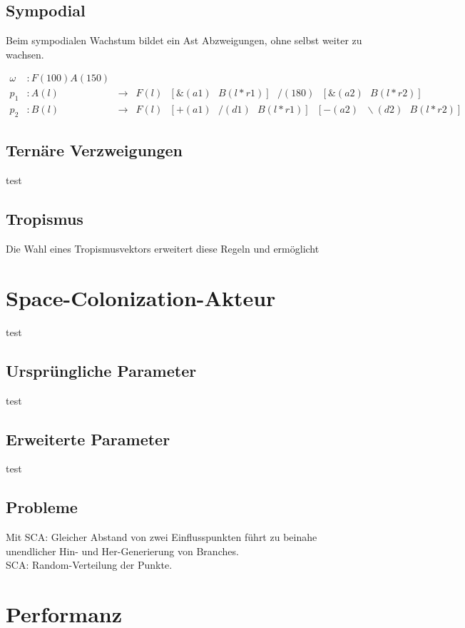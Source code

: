 \subsection{Sympodial}
Beim sympodialen Wachstum bildet ein Ast Abzweigungen, ohne selbst weiter zu wachsen. 

\begin{equation}
\begin{array}{llll}
\omega & : F(100)A(150) \\
p_1 & : A(l) &\rightarrow& F(l)\text{ }[\&(a1)\text{ }B(l*r1)]\text{ }/(180)\text{ }[\&(a2)\text{ }B(l*r2)] \\
p_2 &  : B(l) &\rightarrow& F(l)\text{ }[+(a1)\text{ }/(d1)\text{ }B(l*r1)]\text{ }[-(a2)\text{ }\backslash(d2)\text{ }B(l*r2)]
\end{array}
\label{eq:ProdMonopodial}
\end{equation} 

\subsection{Ternäre Verzweigungen}
test
\subsection{Tropismus}
Die Wahl eines Tropismusvektors erweitert diese Regeln und ermöglicht
\section{Space-Colonization-Akteur}
test
\subsection{Ursprüngliche Parameter}
test
\subsection{Erweiterte Parameter}
test

\subsection{Probleme}
Mit SCA: Gleicher Abstand von zwei Einflusspunkten führt zu beinahe unendlicher Hin- und Her-Generierung von Branches.
\\
SCA: Random-Verteilung der Punkte.

\section{Performanz}


